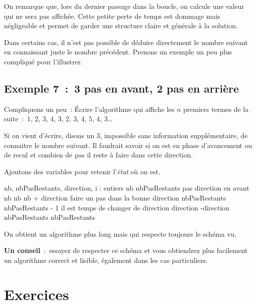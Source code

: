		On remarque que, lors du dernier passage dans la boucle,
		on calcule une valeur qui ne sera pas affichée.
		Cette petite perte de temps est dommage mais négligeable
		et permet de garder une structure claire et générale à la solution.
		
		Dans certains cas,
		il n’est pas possible de déduire directement le nombre suivant
		en connaissant juste le nombre précédent.
		Prenons un exemple un peu plus compliqué pour l’illustrer.
		
	\subsection{Exemple 7~:~3 pas en avant, 2 pas en arrière} 
	
		Compliquons un peu~: 
		\og{}Écrire l’algorithme qui affiche les $n$ premiers termes
		de la suite~:~$1$, $2$, $3$, $4$, $3$, $2$, $3$, $4$, $5$, $4$, $3$\dots\fg{}
	
		Si on vient d’écrire, disons un $3$,
		impossible sans information supplémentaire,
		de connaitre le nombre suivant.
		Il faudrait savoir si on est en phase d’avancement ou de recul
		et combien de pas il reste à faire dans cette direction.
		
		Ajoutons des variables pour retenir l’\emph{état} où on est.
		
		\begin{Pseudocode}
			\Decl nb, nbPasRestants, direction, i : entiers
			\Let nb \Gets 1
			\Let nbPasRestants  \RComment 3 pas
			\Let direction  \RComment en avant
				\Write nb
				\Let nb \Gets nb + direction \RComment faire un pas dans la bonne direction
				\Let nbPasRestants \Gets nbPasRestants - 1
				 \RComment il est temps de changer de direction
					\Let direction \Gets -direction
						\Let nbPasRestants  
					\Else 
						\Let nbPasRestants 
					\EndIf
				\EndIf
			\EndFor
		\EndModule
		\end{Pseudocode}
		
		On obtient un algorithme plus long 
		mais qui respecte toujours le schéma vu.
		
		\textbf{Un conseil}~:~essayez de respecter ce schéma 
		et vous obtiendrez plus facilement un algorithme
		correct et lisible, également dans les cas particuliers.
	
\section{Exercices}

